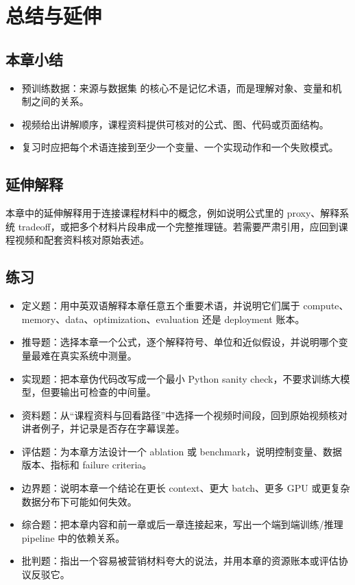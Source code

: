 \documentclass[a4paper]{article}
\begin{document}
\section{总结与延伸}
\subsection{本章小结}
\begin{itemize}
\item 预训练数据：来源与数据集 的核心不是记忆术语，而是理解对象、变量和机制之间的关系。
\item 视频给出讲解顺序，课程资料提供可核对的公式、图、代码或页面结构。
\item 复习时应把每个术语连接到至少一个变量、一个实现动作和一个失败模式。
\end{itemize}
\subsection{延伸解释}
本章中的延伸解释用于连接课程材料中的概念，例如说明公式里的 proxy、解释系统 tradeoff，或把多个材料片段串成一个完整推理链。若需要严肃引用，应回到课程视频和配套资料核对原始表述。
\subsection{练习}
\begin{itemize}
\item 定义题：用中英双语解释本章任意五个重要术语，并说明它们属于 compute、memory、data、optimization、evaluation 还是 deployment 账本。
\item 推导题：选择本章一个公式，逐个解释符号、单位和近似假设，并说明哪个变量最难在真实系统中测量。
\item 实现题：把本章伪代码改写成一个最小 Python sanity check，不要求训练大模型，但要输出可检查的中间量。
\item 资料题：从“课程资料与回看路径”中选择一个视频时间段，回到原始视频核对讲者例子，并记录是否存在字幕误差。
\item 评估题：为本章方法设计一个 ablation 或 benchmark，说明控制变量、数据版本、指标和 failure criteria。
\item 边界题：说明本章一个结论在更长 context、更大 batch、更多 GPU 或更复杂数据分布下可能如何失效。
\item 综合题：把本章内容和前一章或后一章连接起来，写出一个端到端训练/推理 pipeline 中的依赖关系。
\item 批判题：指出一个容易被营销材料夸大的说法，并用本章的资源账本或评估协议反驳它。
\end{itemize}
\end{document}

